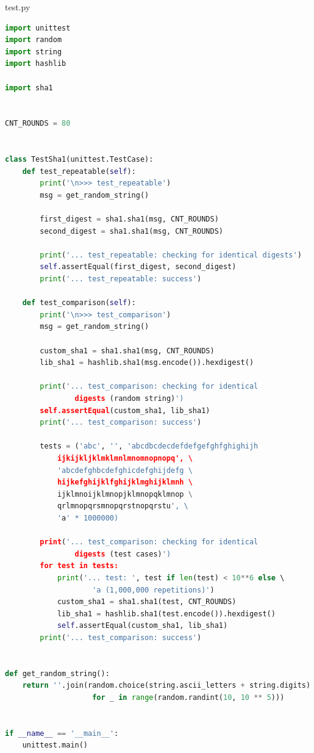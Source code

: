 \documentclass[12pt]{article}
\begin{document}
test.py
\begin{lstlisting}[language=Python]
import unittest
import random
import string
import hashlib

import sha1


CNT_ROUNDS = 80


class TestSha1(unittest.TestCase):
    def test_repeatable(self):
        print('\n>>> test_repeatable')
        msg = get_random_string()

        first_digest = sha1.sha1(msg, CNT_ROUNDS)
        second_digest = sha1.sha1(msg, CNT_ROUNDS)

        print('... test_repeatable: checking for identical digests')
        self.assertEqual(first_digest, second_digest)
        print('... test_repeatable: success')

    def test_comparison(self):
        print('\n>>> test_comparison')
        msg = get_random_string()

        custom_sha1 = sha1.sha1(msg, CNT_ROUNDS)
        lib_sha1 = hashlib.sha1(msg.encode()).hexdigest()

        print('... test_comparison: checking for identical 
                digests (random string)')
        self.assertEqual(custom_sha1, lib_sha1)
        print('... test_comparison: success')

        tests = ('abc', '', 'abcdbcdecdefdefgefghfghighijh
            ijkijkljklmklmnlmnomnopnopq', \
            'abcdefghbcdefghicdefghijdefg \ 
            hijkefghijklfghijklmghijklmnh \
            ijklmnoijklmnopjklmnopqklmnop \
            qrlmnopqrsmnopqrstnopqrstu', \
            'a' * 1000000)

        print('... test_comparison: checking for identical 
                digests (test cases)')
        for test in tests:
            print('... test: ', test if len(test) < 10**6 else \ 
                    'a (1,000,000 repetitions)')
            custom_sha1 = sha1.sha1(test, CNT_ROUNDS)
            lib_sha1 = hashlib.sha1(test.encode()).hexdigest()
            self.assertEqual(custom_sha1, lib_sha1)
        print('... test_comparison: success')


def get_random_string():
    return ''.join(random.choice(string.ascii_letters + string.digits) 
                    for _ in range(random.randint(10, 10 ** 5)))


if __name__ == '__main__':
    unittest.main()
\end{lstlisting}
\end{document}
